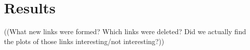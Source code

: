 \section{Results}
\label{sec:usage:results}

((What new links were formed? Which links were deleted? Did we actually find the plots of those links interesting/not interesting?))